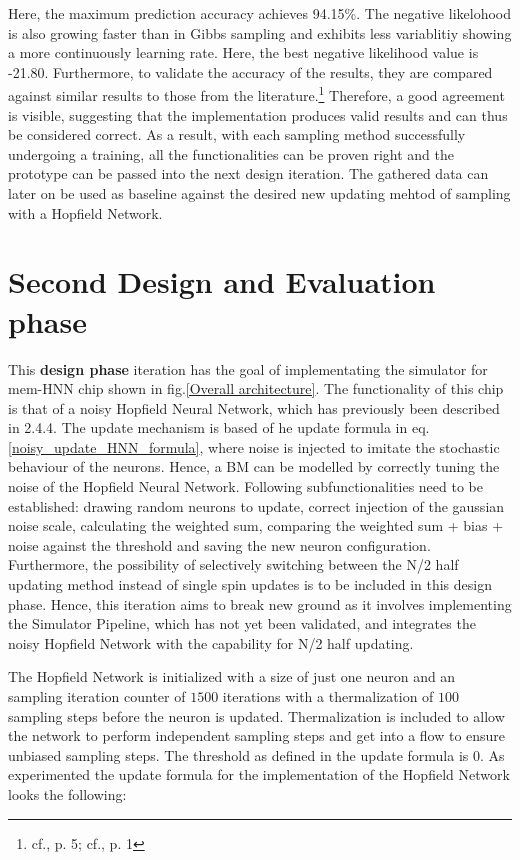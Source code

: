 Here, the maximum prediction accuracy achieves 94.15\%. 
The negative likelohood is also growing faster than in Gibbs sampling and exhibits less variablitiy showing a more continuously learning rate.
Here, the best negative likelihood value is -21.80.
Furthermore, to validate the accuracy of the results, they are compared against similar results to those from the literature.\footnote{cf.\cite{bohmNoiseinjectedAnalogIsing2022a}, p. 5; cf.\cite{RestrictedBoltzmannMachine}, p. 1}
Therefore, a good agreement is visible, suggesting that the implementation produces valid results and can thus be considered correct.
As a result, with each sampling method successfully undergoing a training, all the functionalities can be proven right and the prototype can be passed 
into the next design iteration.
The gathered data can later on be used as baseline against the desired new updating mehtod of sampling with a Hopfield Network.


\section{Second Design and Evaluation phase}

This \textbf{design phase} iteration has the goal of implementating the simulator for \ac{mem-HNN} chip shown in fig.\ref{Overall architecture}.
The functionality of this chip is that of a noisy Hopfield Neural Network, which has previously been described in 2.4.4.
The update mechanism is based of he update formula in eq.\ref{noisy_update_HNN_formula}, where noise is injected to imitate the stochastic behaviour of the neurons.
Hence, a \ac{BM} can be modelled by correctly tuning the noise of the Hopfield Neural Network.
Following subfunctionalities need to be established: drawing random neurons to update,
correct injection of the gaussian noise scale, calculating the weighted sum,
comparing the weighted sum + bias + noise against the threshold and saving the new neuron configuration.
Furthermore, the possibility of selectively switching between the N/2 half updating method instead of single spin updates
is to be included in this design phase. 
Hence, this iteration aims to break new ground as it involves implementing the Simulator Pipeline, which has not yet been validated, and integrates the noisy Hopfield Network with the capability for N/2 half updating.

The Hopfield Network is initialized with a size of just one neuron and an sampling iteration counter of \(1500\) iterations with a thermalization of \(100\) sampling steps before 
the neuron is updated.
Thermalization is included to allow the network to perform independent sampling steps and get into a flow to ensure unbiased sampling steps.
The threshold as defined in the update formula is \(0\). 
As experimented the update formula for the implementation of the Hopfield Network looks the following:

